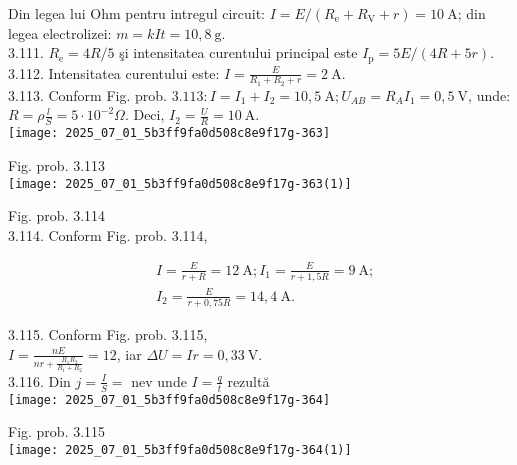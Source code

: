 Din legea lui Ohm pentru intregul circuit: $I=E /\left(R_{\mathrm{e}}+R_{\mathrm{V}}+r\right)=10 \mathrm{~A}$; din legea electrolizei: $m=k I t=10,8 \mathrm{~g}$.\\
3.111. $R_{\mathrm{e}}=4 R / 5$ şi intensitatea curentului principal este $I_{\mathrm{p}}=5 E /(4 R+5 r)$.\\
3.112. Intensitatea curentului este: $I=\frac{E}{R_{1}+R_{2}+r}=2 \mathrm{~A}$.\\
3.113. Conform Fig. prob. $3.113: I=I_{1}+I_{2}=10,5 \mathrm{~A} ; U_{A B}=R_{A} I_{1}=0,5 \mathrm{~V}$, unde: $R=\rho \frac{l}{S}=5 \cdot 10^{-2} \Omega$. Deci, $I_{2}=\frac{U}{R}=10 \mathrm{~A}$.\\
\texttt{[image: 2025\_07\_01\_5b3ff9fa0d508c8e9f17g-363]}

Fig. prob. 3.113\\
\texttt{[image: 2025\_07\_01\_5b3ff9fa0d508c8e9f17g-363(1)]}

Fig. prob. 3.114\\
3.114. Conform Fig. prob. 3.114,

$$
\begin{aligned}
& I=\frac{E}{r+R}=12 \mathrm{~A} ; I_{1}=\frac{E}{r+1,5 R}=9 \mathrm{~A} ; \\
& I_{2}=\frac{E}{r+0,75 R}=14,4 \mathrm{~A} .
\end{aligned}
$$

3.115. Conform Fig. prob. 3.115,\\
$I=\frac{n E}{n r+\frac{R_{1} R_{2}}{R_{1}+R_{2}}}=12$, iar $\Delta U=I r=0,33 \mathrm{~V}$.\\
3.116. Din $j=\frac{I}{S}=$ nev unde $I=\frac{q}{t}$ rezultă\\
\texttt{[image: 2025\_07\_01\_5b3ff9fa0d508c8e9f17g-364]}

Fig. prob. 3.115\\
\texttt{[image: 2025\_07\_01\_5b3ff9fa0d508c8e9f17g-364(1)]}

